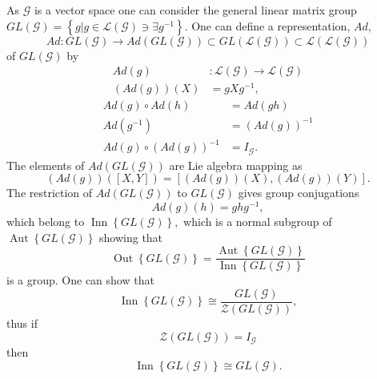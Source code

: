 \documentclass[aps,preprint]{revtex4}%
\begin{document}
As $\mathcal{G}$ is a vector space one can consider the general linear matrix
group $GL\left(  \mathcal{G}\right)  =\left\{  \left.  g\right\vert
g\in\mathcal{L}\left(  \mathcal{G}\right)  \ni\exists g^{-1}\right\}  .$ One
can define a representation, $Ad,$
\begin{equation}
Ad:GL\left(  \mathcal{G}\right)  \rightarrow Ad\left(  GL\left(
\mathcal{G}\right)  \right)  \subset GL\left(  \mathcal{L}\left(
\mathcal{G}\right)  \right)  \subset\mathcal{L}\left(  \mathcal{L}\left(
\mathcal{G}\right)  \right)
\end{equation}
of $GL\left(  \mathcal{G}\right)  $ by
\begin{align}
Ad\left(  g\right)   &  :\mathcal{L}\left(  \mathcal{G}\right)  \rightarrow
\mathcal{L}\left(  \mathcal{G}\right) \\
\left(  Ad\left(  g\right)  \right)  \left(  X\right)   &  =gXg^{-1},
\end{align}%
\begin{align}
Ad\left(  g\right)  \circ Ad\left(  h\right)   &  =Ad\left(  gh\right) \\
Ad\left(  g^{-1}\right)   &  =\left(  Ad\left(  g\right)  \right)  ^{-1}\\
Ad\left(  g\right)  \circ\left(  Ad\left(  g\right)  \right)  ^{-1}  &
=I_{\mathcal{G}}.
\end{align}
The elements of $Ad\left(  GL\left(  \mathcal{G}\right)  \right)  $ are Lie
algebra mapping as
\begin{equation}
\left(  Ad\left(  g\right)  \right)  \left(  \left[  X,Y\right]  \right)
=\left[  \left(  Ad\left(  g\right)  \right)  \left(  X\right)  ,\left(
Ad\left(  g\right)  \right)  \left(  Y\right)  \right]  .
\end{equation}
The restriction of $Ad\left(  GL\left(  \mathcal{G}\right)  \right)  $ to
$GL\left(  \mathcal{G}\right)  $ gives group conjugations
\begin{equation}
Ad\left(  g\right)  \left(  h\right)  =ghg^{-1},
\end{equation}
which belong to $\operatorname*{Inn}\left\{  GL\left(  \mathcal{G}\right)
\right\}  ,$ which is a normal subgroup of $\operatorname{Aut}\left\{
GL\left(  \mathcal{G}\right)  \right\}  $ showing that
\begin{equation}
\operatorname*{Out}\left\{  GL\left(  \mathcal{G}\right)  \right\}
=\frac{\operatorname{Aut}\left\{  GL\left(  \mathcal{G}\right)  \right\}
}{\operatorname*{Inn}\left\{  GL\left(  \mathcal{G}\right)  \right\}  }%
\end{equation}
is a group. One can show that
\begin{equation}
\operatorname*{Inn}\left\{  GL\left(  \mathcal{G}\right)  \right\}  \cong%
\frac{GL\left(  \mathcal{G}\right)  }{\mathcal{Z}\left(  GL\left(
\mathcal{G}\right)  \right)  },
\end{equation}
thus if
\begin{equation}
\mathcal{Z}\left(  GL\left(  \mathcal{G}\right)  \right)  =I_{\mathcal{G}}%
\end{equation}
then
\begin{equation}
\operatorname*{Inn}\left\{  GL\left(  \mathcal{G}\right)  \right\}  \cong
GL\left(  \mathcal{G}\right)  .
\end{equation}
\end{document}
